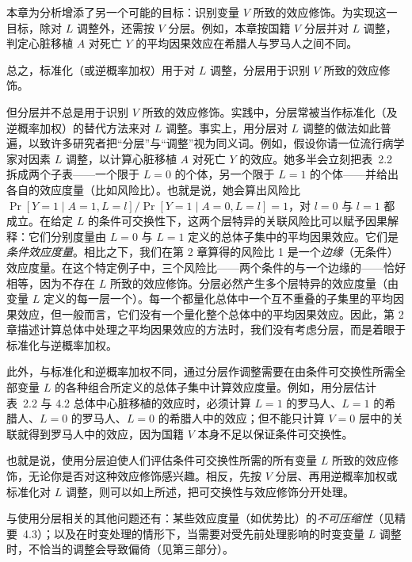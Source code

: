 本章为分析增添了另一个可能的目标：识别变量 $V$ 所致的效应修饰。为实现这一目标，除对 $L$ 调整外，还需按 $V$ 分层。例如，本章按国籍 $V$ 分层并对 $L$ 调整，判定心脏移植 $A$ 对死亡 $Y$ 的平均因果效应在希腊人与罗马人之间不同。

总之，标准化（或逆概率加权）用于对 $L$ 调整，分层用于识别 $V$ 所致的效应修饰。

但分层并不总是用于识别 $V$ 所致的效应修饰。实践中，分层常被当作标准化（及逆概率加权）的替代方法来对 $L$ 调整。事实上，用分层对 $L$ 调整的做法如此普遍，以致许多研究者把“分层”与“调整”视为同义词。例如，假设你请一位流行病学家对因素 $L$ 调整，以计算心脏移植 $A$ 对死亡 $Y$ 的效应。她多半会立刻把表~2.2 拆成两个子表——一个限于 $L=0$ 的个体，另一个限于 $L=1$ 的个体——并给出各自的效应度量（比如风险比）。也就是说，她会算出风险比 $\Pr[Y=1\mid A=1,L=l]/\Pr[Y=1\mid A=0,L=l]=1$，对 $l=0$ 与 $l=1$ 都成立。在给定 $L$ 的条件可交换性下，这两个层特异的关联风险比可以赋予因果解释：它们分别度量由 $L=0$ 与 $L=1$ 定义的总体子集中的平均因果效应。它们是\emph{条件效应度量}。相比之下，我们在第 2 章算得的风险比 1 是一个\emph{边缘}（无条件）效应度量。在这个特定例子中，三个风险比——两个条件的与一个边缘的——恰好相等，因为不存在 $L$ 所致的效应修饰。分层必然产生多个层特异的效应度量（由变量 $L$ 定义的每一层一个）。每一个都量化总体中一个互不重叠的子集里的平均因果效应，但一般而言，它们没有一个量化整个总体中的平均因果效应。因此，第 2 章描述计算总体中处理之平均因果效应的方法时，我们没有考虑分层，而是着眼于标准化与逆概率加权。

此外，与标准化和逆概率加权不同，通过分层作调整需要在由条件可交换性所需全部变量 $L$ 的各种组合所定义的总体子集中计算效应度量。例如，用分层估计表~2.2 与 4.2 总体中心脏移植的效应时，必须计算 $L=1$ 的罗马人、$L=1$ 的希腊人、$L=0$ 的罗马人、$L=0$ 的希腊人中的效应；但不能只计算 $V=0$ 层中的关联就得到罗马人中的效应，因为国籍 $V$ 本身不足以保证条件可交换性。

也就是说，使用分层迫使人们评估条件可交换性所需的所有变量 $L$ 所致的效应修饰，无论你是否对这种效应修饰感兴趣。相反，先按 $V$ 分层、再用逆概率加权或标准化对 $L$ 调整，则可以如上所述，把可交换性与效应修饰分开处理。

与使用分层相关的其他问题还有：某些效应度量（如优势比）的\emph{不可压缩性}（见精要~4.3）；以及在时变处理的情形下，当需要对受先前处理影响的时变变量 $L$ 调整时，不恰当的调整会导致偏倚（见第三部分）。

